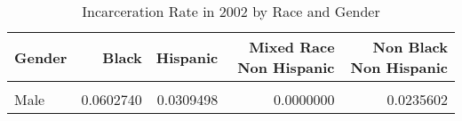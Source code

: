 \begin{table}[H]

\caption{\label{tab:tab:summarystats}Incarceration Rate in 2002 by Race and Gender}
\centering
\begin{tabular}[t]{lrrrr}
\toprule
Gender & Black & Hispanic & Mixed Race Non Hispanic & Non Black Non Hispanic\\
\midrule
\cellcolor{gray!6}{Female} & \cellcolor{gray!6}{0.0079225} & \cellcolor{gray!6}{0.0066225} & \cellcolor{gray!6}{0.0238095} & \cellcolor{gray!6}{0.0059798}\\
Male & 0.0602740 & 0.0309498 & 0.0000000 & 0.0235602\\
\bottomrule
\end{tabular}
\end{table}
